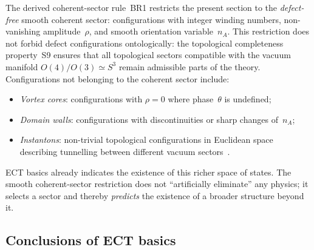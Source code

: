 \documentclass[11pt,a4paper]{article}
\numberwithin{equation}{section}
\begin{document}
The derived coherent-sector rule~BR1 restricts the present section to the
\emph{defect-free} smooth coherent sector: configurations with integer
winding numbers, non-vanishing amplitude~$\rho$, and smooth orientation
variable~$n_A$.
This restriction does not forbid defect configurations ontologically:
the topological completeness property~S9 ensures that all topological
sectors compatible with the vacuum manifold $O(4)/O(3)\simeq S^3$
remain admissible parts of the theory.
Configurations not belonging to the coherent sector include:
\begin{itemize}
  \item \textit{Vortex cores}: configurations with $\rho=0$ where
    phase~$\theta$ is undefined;
  \item \textit{Domain walls}: configurations with discontinuities
    or sharp changes of~$n_A$;
  \item \textit{Instantons}: non-trivial topological configurations
    in Euclidean space describing tunnelling between different
    vacuum sectors~\cite{Belavin1975}.
\end{itemize}
ECT basics already indicates the existence of this richer space
of states. The smooth coherent-sector restriction does not ``artificially eliminate''
any physics; it selects a sector and thereby \emph{predicts} the
existence of a broader structure beyond it.

\subsection{Conclusions of ECT basics}
\label{sec:basics_summary}
\end{document}
